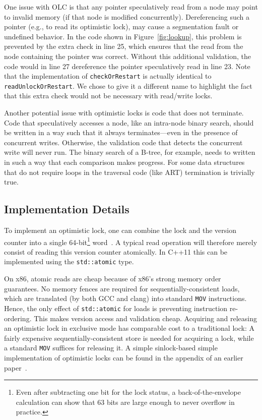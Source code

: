 \documentclass[11pt]{article}
\begin{document}
One issue with OLC is that any pointer speculatively read from a node may point to invalid memory (if that node is modified concurrently).
Dereferencing such a pointer (e.g., to read its optimistic lock), may cause a segmentation fault or undefined behavior.
In the code shown in Figure~\ref{fig:lookup}, this problem is prevented by the extra check in line 25, which ensures that the read from the node containing the pointer was correct.
Without this additional validation, the code would in line 27 dereference the pointer speculatively read in line 23.
Note that the implementation of \texttt{checkOrRestart} is actually identical to \texttt{readUnlockOrRestart}.
We chose to give it a different name to highlight the fact that this extra check would not be necessary with read/write locks.

Another potential issue with optimistic locks is code that does not terminate.
Code that speculatively accesses a node, like an intra-node binary search, should be written in a way such that it always terminates---even in the presence of concurrent writes.
Otherwise, the validation code that detects the concurrent write will never run.
The binary search of a B-tree, for example, needs to written in such a way that each comparison makes progress.
For some data structures that do not require loops in the traversal code (like ART) termination is trivially true.

\subsection{Implementation Details}

To implement an optimistic lock, one can combine the lock and the version counter into a single 64-bit\footnote{Even after subtracting one bit for the lock status, a back-of-the-envelope calculation can show that 63 bits are large enough to never overflow in practice.} word~\cite{artsync}.
A typical read operation will therefore merely consist of reading this version counter atomically.
In C++11 this can be implemented using the \texttt{std::atomic} type.

On x86, atomic reads are cheap because of x86's strong memory order guarantees.
No memory fences are required for sequentially-consistent loads, which are translated (by both GCC and clang) into standard \texttt{MOV} instructions.
Hence, the only effect of \texttt{std::atomic} for loads is preventing instruction re-ordering.
This makes version access and validation cheap.
Acquiring and releasing an optimistic lock in exclusive mode has comparable cost to a traditional lock:
A fairly expensive sequentially-consistent store is needed for acquiring a lock, while a standard \texttt{MOV} suffices for releasing it.
A simple sinlock-based simple implementation of optimistic locks can be found in the appendix of an earlier paper~\cite{artsync}.
\end{document}
